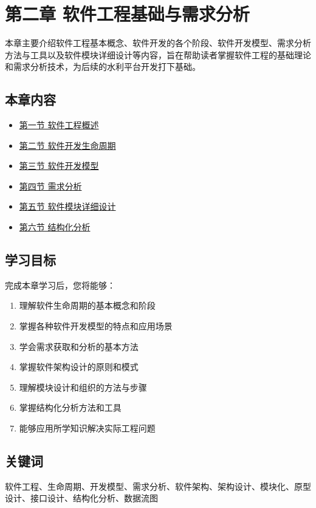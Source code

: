 \section{第二章
软件工程基础与需求分析}\label{ux7b2cux4e8cux7ae0-ux8f6fux4ef6ux5de5ux7a0bux57faux7840ux4e0eux9700ux6c42ux5206ux6790}

本章主要介绍软件工程基本概念、软件开发的各个阶段、软件开发模型、需求分析方法与工具以及软件模块详细设计等内容，旨在帮助读者掌握软件工程的基础理论和需求分析技术，为后续的水利平台开发打下基础。

\subsection{本章内容}\label{ux672cux7ae0ux5185ux5bb9}

\begin{itemize}
\tightlist
\item
  \href{section02-01.md}{第一节 软件工程概述}
\item
  \href{section02-02.md}{第二节 软件开发生命周期}
\item
  \href{section02-03.md}{第三节 软件开发模型}
\item
  \href{section02-04.md}{第四节 需求分析}
\item
  \href{section02-05.md}{第五节 软件模块详细设计}
\item
  \href{section02-06.md}{第六节 结构化分析}
\end{itemize}

\subsection{学习目标}\label{ux5b66ux4e60ux76eeux6807}

完成本章学习后，您将能够：

\begin{enumerate}
\def\labelenumi{\arabic{enumi}.}
\tightlist
\item
  理解软件生命周期的基本概念和阶段
\item
  掌握各种软件开发模型的特点和应用场景
\item
  学会需求获取和分析的基本方法
\item
  掌握软件架构设计的原则和模式
\item
  理解模块设计和组织的方法与步骤
\item
  掌握结构化分析方法和工具
\item
  能够应用所学知识解决实际工程问题
\end{enumerate}

\subsection{关键词}\label{ux5173ux952eux8bcd}

软件工程、生命周期、开发模型、需求分析、软件架构、架构设计、模块化、原型设计、接口设计、结构化分析、数据流图
